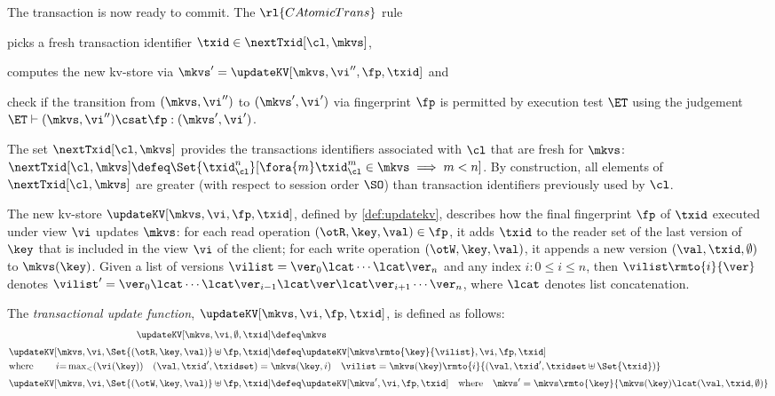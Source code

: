 The transaction is now ready to commit. 
The \( \rl{CAtomicTrans} \) rule
\begin{enumerate*}
\item picks a fresh transaction identifier $\txid \in \nextTxid[\cl, \mkvs]$, 
\item computes the new kv-store via $\mkvs' = \updateKV[\mkvs, \vi'', \fp, \txid]$ and 
\item check if the transition from \( (\mkvs, \vi'') \)  to 
    \( (\mkvs', \vi') \) via fingerprint \( \fp \) is permitted by execution test $\ET$
    using the judgement $\ET \vdash (\mkvs, \vi'') \csat \fp : (\mkvs', \vi')$.
\end{enumerate*}
The set $\nextTxid[\cl, \mkvs]$ provides the transactions identifiers
associated with $\cl$ that are fresh for  $\mkvs$:
\(
\nextTxid[\cl, \mkvs] \defeq 
\Set{\txid_{\cl}^{n}}[%
\fora{m} \txid_{\cl}^{m} \in \mkvs \implies m < n ]
\).
By construction, all elements of $\nextTxid[\cl, \mkvs]$ are greater (with respect to session order $\SO$) 
than transaction identifiers previously used by $\cl$. 

The new kv-store $\updateKV[\mkvs, \vi, \fp, \txid]$, defined by \cref{def:updatekv}, 
describes how the final fingerprint $\fp$ of $\txid$ executed under view $\vi$ updates $\mkvs$:
for each read operation $(\otR, \key, \val) \in \fp$, it adds $\txid$ 
to the reader set of the last version of $\key$ that is included in the view $\vi$ of the client; 
for each write operation $(\otW, \key, \val)$, it appends a new version $(\val, \txid, \emptyset)$ 
to $\mkvs(\key)$. 
Given a list of versions $\vilist = \ver_0 \lcat \cdots \lcat \ver_n$ 
and any index $i: 0 \leq i \leq n$, 
then $\vilist\rmto{i}{\ver}$ denotes 
$\vilist' = \ver_0 \lcat \cdots \lcat \ver_{i-1} \lcat \ver \lcat \ver_{i+1} \cdots \ver_{n}$,
where $\lcat$ denotes list concatenation. 

\begin{definition}
\label{eq:updatekv}
\label{def:updatekv}
The \emph{transactional update function},  $\updateKV[\mkvs, \vi, \fp, \txid]$,  is
defined as follows:
%
{%
\[%
\begin{aligned}
    \updateKV[\mkvs, \vi, \emptyset, \txid] & \defeq \mkvs 
    \\[3pt]
    \updateKV[\mkvs, \vi, \Set{(\otR, \key, \val)} \uplus \fp, \txid]
    & \defeq \updateKV[\mkvs\rmto{\key}{\vilist},\vi, \fp, \txid] \\
    \omit\rlap{where \qquad \( i {=} \max_{<}(\vi(\key)) \quad (\val, \txid', \txidset) = \mkvs(\key, i) 
            \quad \vilist = \mkvs(\key)\rmto{i}{(\val, \txid', \txidset \uplus \Set{ \txid })}\)} 
    \\[3pt]
%	
	\updateKV[\mkvs, \vi, \Set{(\otW, \key, \val)} \uplus \fp, \txid] 
    & \defeq \updateKV[\mkvs', \vi, \fp, \txid] \quad \text{where} \quad  \mkvs' = \mkvs\rmto{\key}{ \mkvs(\key) \lcat (\val, \txid, \emptyset) } \\
\end{aligned}
\]%
}%
\end{definition}

